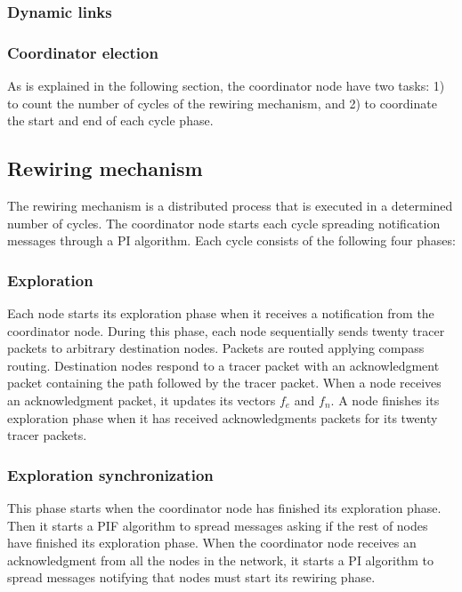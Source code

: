 \subsubsection{Dynamic links}

\subsubsection{Coordinator election}

As is explained in the following section, the coordinator node have two tasks: 1) to count the number of cycles of the rewiring mechanism, and 2) to coordinate the start and end of each cycle phase.



\subsection{Rewiring mechanism}

The rewiring mechanism is a distributed process that is executed in a determined number of cycles. The coordinator node starts each cycle spreading notification messages through a PI algorithm. Each cycle consists of the following four phases:

\subsubsection{Exploration}

Each node starts its exploration phase when it receives a notification from the coordinator node. During this phase, each node sequentially sends twenty tracer packets to arbitrary destination nodes. Packets are routed applying compass routing. Destination nodes respond to a tracer packet with an acknowledgment packet containing the path followed by the tracer packet.
When a node receives an acknowledgment packet, it updates its vectors $f_e$ and $f_n$. A node finishes its exploration phase when it has received acknowledgments packets for its twenty tracer packets.

\subsubsection{Exploration synchronization}

This phase starts when the coordinator node has finished its exploration phase. Then it starts a PIF algorithm to spread messages asking if the rest of nodes have finished its exploration phase. When the coordinator node receives an acknowledgment from all the nodes in the network,  it starts a PI algorithm to spread messages notifying that nodes must start its rewiring phase.

